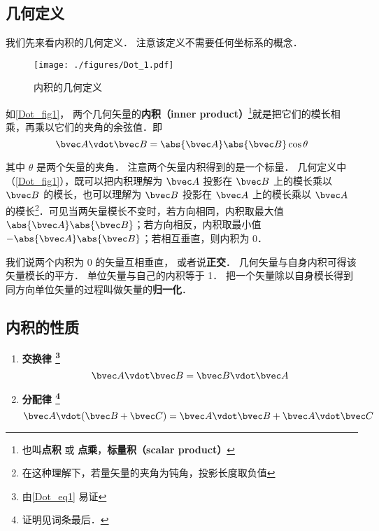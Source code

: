 

\subsection{几何定义}
我们先来看内积的几何定义． 注意该定义不需要任何坐标系的概念．
\begin{figure}[th]
\centering
\texttt{[image: ./figures/Dot\_1.pdf]}
\caption{内积的几何定义}\label{Dot_fig1}
\end{figure}

如\autoref{Dot_fig1}， 两个几何矢量的\textbf{内积（inner product）}\footnote{也叫\textbf{点积} 或 \textbf{点乘}，\textbf{标量积（scalar product）}}就是把它们的模长相乘，再乘以它们的夹角的余弦值．即
\begin{equation}\label{Dot_eq1}
\bvec A \vdot \bvec B = \abs{\bvec A} \abs{\bvec B} \cos\theta 
\end{equation}

其中 $\theta$ 是两个矢量的夹角． 注意两个矢量内积得到的是一个标量． 几何定义中（\autoref{Dot_fig1}），既可以把内积理解为 $\bvec A$ 投影在 $\bvec B$ 上的模长乘以 $\bvec B$ 的模长，也可以理解为 $\bvec B$ 投影在 $\bvec A$ 上的模长乘以 $\bvec A$ 的模长\footnote{在这种理解下，若量矢量的夹角为钝角，投影长度取负值}．可见当两矢量模长不变时，若方向相同，内积取最大值 $\abs{\bvec A}\abs{\bvec B}$；若方向相反，内积取最小值 $-\abs{\bvec A}\abs{\bvec B}$；若相互垂直，则内积为 0．

我们说两个内积为 0 的矢量互相垂直， 或者说\textbf{正交}． 几何矢量与自身内积可得该矢量模长的平方． 单位矢量与自己的内积等于 1． 把一个矢量除以自身模长得到同方向单位矢量的过程叫做矢量的\textbf{归一化}．

\subsection{内积的性质}

\begin{enumerate}
\item \textbf{交换律 \footnote{由\autoref{Dot_eq1} 易证}}
\begin{equation}\label{Dot_eq2}
\bvec A \vdot \bvec B = \bvec B \vdot \bvec A
\end{equation}

\item \textbf{分配律 \footnote{证明见词条最后．}}
\begin{equation}\label{Dot_eq3}
\bvec A \vdot (\bvec B + \bvec C) = \bvec A \vdot \bvec B + \bvec A \vdot \bvec C
\end{equation}
\end{enumerate}

